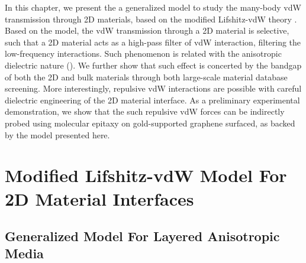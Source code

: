 In this chapter, we present
the a generalized model to study the many-body vdW transmission
through 2D materials, based on the modified Lifshitz-vdW theory
\cite{Dzyaloshinskii_1961_lifshitz,parsegian_van_2010_book}.
%
Based on the model, the vdW transmission through a 2D material is
selective, such that a 2D material acts as a high-pass filter of vdW
interaction, filtering the low-frequency interactions.
%
Such phenomenon is related with the anisotropic dielectric nature ().
%
We further show that such effect is concerted by the bandgap of both the
2D and bulk materials through both large-scale material database
screening.
%
More interestingly, repulsive vdW interactions are possible with careful dielectric engineering of the 2D material interface.
%
As a preliminary experimental demonstration, we show that the such
repulsive vdW forces can be indirectly probed using molecular epitaxy
on gold-supported graphene surfaced, as backed by the model presented
here.

\section{Modified Lifshitz-vdW Model For 2D Material Interfaces}
\label{sec:vdw-model-lifshitz}

\subsection{Generalized Model For Layered Anisotropic Media}
\label{sec:vdw-gener-model-layer}

